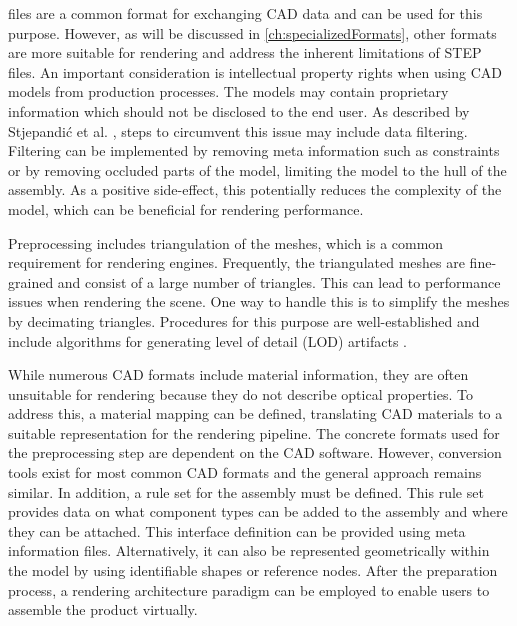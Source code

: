  files are a common format for exchanging \gls{CAD} data and can be used for this purpose. However, as will be discussed in \autoref{ch:specializedFormats}, other formats are more suitable for rendering and address the inherent limitations of \gls{STEP} files. An important consideration is intellectual property rights when using \gls{CAD} models from production processes. The models may contain proprietary information which should not be disclosed to the end user. As described by Stjepandić et al. \cite{ipr}, steps to circumvent this issue may include data filtering. Filtering can be implemented by removing meta information such as constraints or by removing occluded parts of the model, limiting the model to the hull of the assembly. As a positive side-effect, this potentially reduces the complexity of the model, which can be beneficial for rendering performance.

Preprocessing includes triangulation of the meshes, which is a common requirement for rendering engines. Frequently, the triangulated meshes are fine-grained and consist of a large number of triangles. This can lead to performance issues when rendering the scene. One way to handle this is to simplify the meshes by decimating triangles. Procedures for this purpose are well-established and include algorithms for generating level of detail (\gls{LOD}) artifacts \cite{luebke2003level}.

While numerous \gls{CAD} formats include material information, they are often unsuitable for rendering because they do not describe optical properties. To address this, a material mapping can be defined, translating \gls{CAD} materials to a suitable representation for the rendering pipeline. The concrete formats used for the preprocessing step are dependent on the \gls{CAD} software. However, conversion tools exist for most common \gls{CAD} formats and the general approach remains similar. In addition, a rule set for the assembly must be defined. This rule set provides data on what component types can be added to the assembly and where they can be attached. This interface definition can be provided using meta information files. Alternatively, it can also be represented geometrically within the model by using identifiable shapes or reference nodes. After the preparation process, a rendering architecture paradigm can be employed to enable users to assemble the product virtually.

